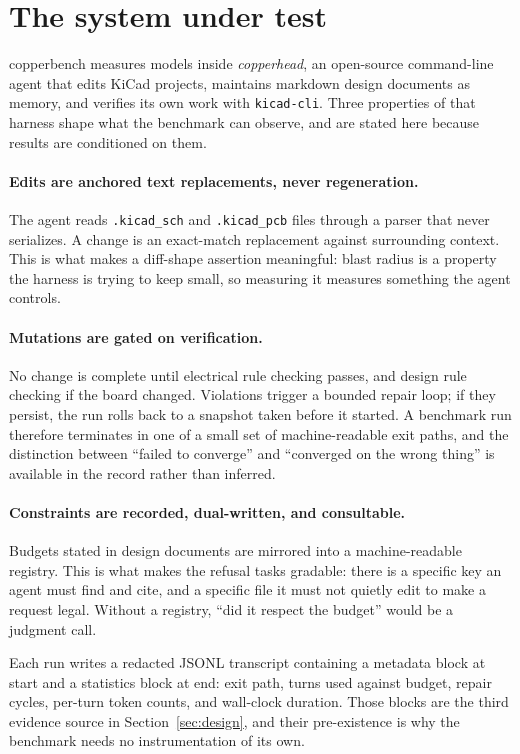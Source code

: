 \section{The system under test}
\label{sec:system}

copperbench measures models inside \emph{copperhead}, an open-source command-line agent that edits KiCad projects, maintains markdown design documents as memory, and verifies its own work with \texttt{kicad-cli}. Three properties of that harness shape what the benchmark can observe, and are stated here because results are conditioned on them.

\paragraph{Edits are anchored text replacements, never regeneration.} The agent reads \texttt{.kicad\_sch} and \texttt{.kicad\_pcb} files through a parser that never serializes. A change is an exact-match replacement against surrounding context. This is what makes a diff-shape assertion meaningful: blast radius is a property the harness is trying to keep small, so measuring it measures something the agent controls.

\paragraph{Mutations are gated on verification.} No change is complete until electrical rule checking passes, and design rule checking if the board changed. Violations trigger a bounded repair loop; if they persist, the run rolls back to a snapshot taken before it started. A benchmark run therefore terminates in one of a small set of machine-readable exit paths, and the distinction between ``failed to converge'' and ``converged on the wrong thing'' is available in the record rather than inferred.

\paragraph{Constraints are recorded, dual-written, and consultable.} Budgets stated in design documents are mirrored into a machine-readable registry. This is what makes the refusal tasks gradable: there is a specific key an agent must find and cite, and a specific file it must not quietly edit to make a request legal. Without a registry, ``did it respect the budget'' would be a judgment call.

Each run writes a redacted JSONL transcript containing a metadata block at start and a statistics block at end: exit path, turns used against budget, repair cycles, per-turn token counts, and wall-clock duration. Those blocks are the third evidence source in Section~\ref{sec:design}, and their pre-existence is why the benchmark needs no instrumentation of its own.
